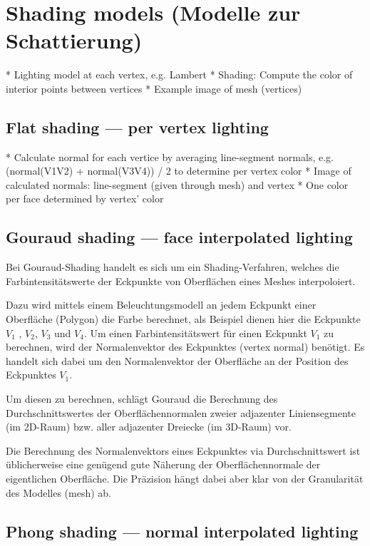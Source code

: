 
\section{Shading models (Modelle zur Schattierung)}
\label{sec:shading}

* Lighting model at each vertex, e.g. Lambert
* Shading: Compute the color of interior points between vertices
* Example image of mesh (vertices)

\subsection{Flat shading --- per vertex lighting}
\label{subsec:flat_shading}

* Calculate normal for each vertice by averaging line-segment normals, e.g.
  (normal(V1V2) + normal(V3V4)) / 2 to determine per vertex color
  * Image of calculated normals: line-segment (given through mesh) and vertex
* One color per face determined by vertex' color

\subsection{Gouraud shading --- face interpolated lighting}
\label{subsec:gouraud_shading}

Bei Gouraud-Shading handelt es sich um ein Shading-Verfahren, welches die
Farbintensitätswerte der Eckpunkte von Oberflächen eines Meshes interpoloiert.

Dazu wird mittels einem Beleuchtungsmodell an jedem Eckpunkt einer Oberfläche
(Polygon) die Farbe berechnet, als Beispiel dienen hier die Eckpunkte $V_{1}$ ,
$V_{2}$, $V_{3}$ und $V_{4}$. Um einen Farbintensitätswert für einen Eckpunkt
$V_{1}$ zu berechnen, wird der Normalenvektor des Eckpunktes (vertex normal)
benötigt. Es handelt sich dabei um den Normalenvektor der Oberfläche an der
Position des Eckpunktes $V_{1}$.

Um diesen zu berechnen, schlägt Gouraud die Berechnung des Durchschnittswertes
der Oberflächennormalen zweier adjazenter Liniensegmente (im 2D-Raum) bzw.
aller adjazenter Dreiecke (im 3D-Raum) vor.


Die Berechnung des Normalenvektors eines Eckpunktes via Durchschnittswert ist
üblicherweise eine genügend gute Näherung der Oberflächennormale der
eigentlichen Oberfläche. Die Präzision hängt dabei aber klar von der
Granularität des Modelles (mesh) ab.

\subsection{Phong shading --- normal interpolated lighting}
\label{subsec:phong_shading}
